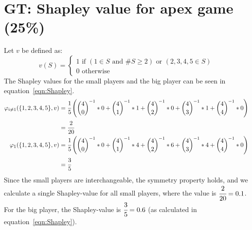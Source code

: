 \section{GT: Shapley value for apex game (25\%)}
Let $v$ be defined as:
\begin{equation*}
    v(S)=\left\{\begin{array}{lll}
        1\mbox{ if } (1\in S\mbox{ and } \#S\geq 2)\mbox{ or } (2, 3, 4, 5\in S)\\
        0\mbox{ otherwise }
    \end{array}
    \right.
\end{equation*}
The Shapley values for the small players and the big player can be seen in equation~\ref{eqn:Shapley}.
\begin{align}
    \begin{split}
        \varphi_{i\neq 1}(\{1, 2, 3, 4, 5\}, v)&=\cfrac{1}{5}\left(
            \binom{4}{0}^{-1}*0 + \binom{4}{1}^{-1}*1 + \binom{4}{2}^{-1}*0 + 
            \binom{4}{3}^{-1}*1 + \binom{4}{4}^{-1}*0
        \right)\\
        &=\cfrac{2}{20}\\
        \varphi_{1}(\{1, 2, 3, 4, 5\}, v)&=\cfrac{1}{5}\left(
            \binom{4}{0}^{-1}*0 + \binom{4}{1}^{-1}*4 + \binom{4}{2}^{-1}*6 + 
            \binom{4}{3}^{-1}*4 + \binom{4}{4}^{-1}*0
        \right)\\
        &=\cfrac{3}{5}
    \end{split}
    \label{eqn:Shapley}
\end{align}
Since the small players are interchangeable, the symmetry property holds, and we calculate a
single Shapley-value for all small players, where the value is $\cfrac{2}{20}=0.1$. For the big
player, the Shapley-value is $\cfrac{3}{5}=0.6$ (as calculated in equation~\ref{eqn:Shapley}).